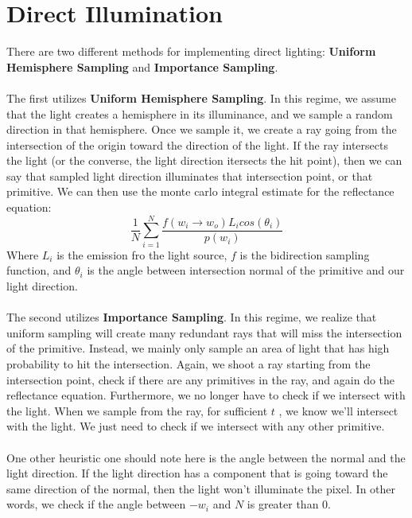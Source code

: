 \documentclass{article}
\begin{document}
\section{Direct Illumination}
There are two different methods for implementing direct lighting: \textbf{Uniform Hemisphere Sampling} and \textbf{Importance Sampling}.
\\
\\
The first utilizes \textbf{Uniform Hemisphere Sampling}. In this regime, we assume that the light creates a hemisphere in its illuminance, and we sample a random direction in that hemisphere. Once we sample it, we create a ray going from the intersection of the origin toward the direction of the light. If the ray intersects the light (or the converse, the light direction itersects the hit point), then we can say that sampled light direction illuminates that intersection point, or that primitive. We can then use the monte carlo integral estimate for the reflectance equation:
$$\frac{1}{N}\sum_{i = 1}^N \frac{f(w_i \to w_o)L_i cos(\theta_i)}{p(w_i)}$$
Where $L_i$ is the emission fro the light source, $f$ is the bidirection sampling function, and $\theta_i$ is the angle between intersection normal of the primitive and our light direction. 
\\
\\
The second utilizes \textbf{Importance Sampling}. In this regime, we realize that uniform sampling will create many redundant rays that will miss the intersection of the primitive. Instead, we mainly only sample an area of light that has high probability to hit the intersection. Again, we shoot a ray starting from the intersection point, check if there are any primitives in the ray, and again do the reflectance equation. Furthermore, we no longer have to check if we intersect with the light. When we sample from the ray, for sufficient $t$ , we know we'll intersect with the light. We just need to check if we intersect with any other primitive.
\\
\\
One other heuristic one should note here is the angle between the normal and the light direction. If the light direction has a component that is going toward the same direction of the normal, then the light won't illuminate the pixel. In other words, we check if the angle between $-w_i$ and $N$ is greater than 0.
\end{document}
